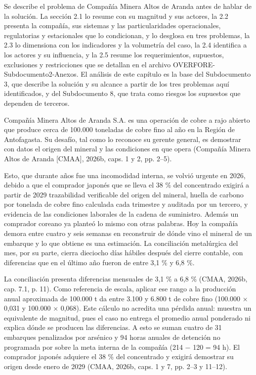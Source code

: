 \documentclass[subdoc]{../../comun/overfore}
\begin{document}
Se describe el problema de Compañía Minera Altos de Aranda antes de hablar de la solución. La sección 2.1 lo resume con su magnitud y sus actores, la 2.2 presenta la compañía, sus sistemas y las particularidades operacionales, regulatorias y estacionales que lo condicionan, y lo desglosa en tres problemas, la 2.3 lo dimensiona con los indicadores y la volumetría del caso, la 2.4 identifica a los actores y su influencia, y la 2.5 resume los requerimientos, supuestos, exclusiones y restricciones que se detallan en el archivo OVERFORE-Subdocumento2-Anexos. El análisis de este capítulo es la base del Subdocumento 3, que describe la solución y su alcance a partir de los tres problemas aquí identificados, y del Subdocumento 8, que trata como riesgos los supuestos que dependen de terceros.

Compañía Minera Altos de Aranda S.A. es una operación de cobre a rajo abierto que produce cerca de 100.000 toneladas de cobre fino al año en la Región de Antofagasta. Su desafío, tal como lo reconoce su gerente general, es demostrar con datos el origen del mineral y las condiciones en que opera (Compañía Minera Altos de Aranda [CMAA], 2026b, caps. 1 y 2, pp. 2–5).

Esto, que durante años fue una incomodidad interna, se volvió urgente en 2026, debido a que el comprador japonés que se lleva el 38 \% del concentrado exigirá a partir de 2029 trazabilidad verificable del origen del mineral, huella de carbono por tonelada de cobre fino calculada cada trimestre y auditada por un tercero, y evidencia de las condiciones laborales de la cadena de suministro. Además un comprador coreano ya planteó lo mismo con otras palabras. Hoy la compañía demora entre cuatro y seis semanas en reconstruir de dónde vino el mineral de un embarque y lo que obtiene es una estimación. La conciliación metalúrgica del mes, por su parte, cierra dieciocho días hábiles después del cierre contable, con diferencias que en el último año fueron de entre 3,1 \% y 6,8 \%.

La conciliación presenta diferencias mensuales de 3,1 \% a 6,8 \% (CMAA, 2026b, cap. 7.1, p. 11). Como referencia de escala, aplicar ese rango a la producción anual aproximada de 100.000 t da entre 3.100 y 6.800 t de cobre fino (100.000 × 0,031 y 100.000 × 0,068). Este cálculo no acredita una pérdida anual: muestra un equivalente de magnitud, pues el caso no entrega el promedio anual ponderado ni explica dónde se producen las diferencias. A esto se suman cuatro de 31 embarques penalizados por arsénico y 94 horas anuales de detención no programada por sobre la meta interna de la compañía (214 − 120 = 94 h). El comprador japonés adquiere el 38 \% del concentrado y exigirá demostrar su origen desde enero de 2029 (CMAA, 2026b, caps. 1 y 7, pp. 2–3 y 11–12).
\end{document}
